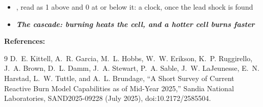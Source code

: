 \documentclass[11pt,addpoints]{exam}
\begin{document}
\begin{tcolorbox}[breakable]
\begin{itemize}
\item {}, \hspace{3mm} read  as 1 above  and 0 at or below it: \hspace{2mm} a clock, once the lead shock is found\vspace{.5em}
\item \textbf{\emph{The cascade: burning heats the cell, and a hotter cell burns faster}}
\end{itemize}
\end{tcolorbox}


\clearpage

\begin{tcolorbox}[breakable]
\textbf{References:}\vspace{.5em}

\begingroup
\renewcommand{\section}[2]{}%
\begin{thebibliography}{9}
\setlength{\itemsep}{0.25em}
D.~E. Kittell, A.~R. Garcia, M.~L. Hobbs, W.~W. Erikson, K.~P. Ruggirello, J.~A. Brown, D.~L. Damm, J.~A. Stewart, P.~A. Sable, J.~W. LaJeunesse, E.~N. Harstad, L.~W. Tuttle, and A.~L. Brundage, ``A Short Survey of Current Reactive Burn Model Capabilities as of Mid-Year 2025,'' Sandia National Laboratories, SAND2025-09228 (July 2025), doi:10.2172/2585504.
\end{thebibliography}
\endgroup
\end{tcolorbox}
\end{document}
